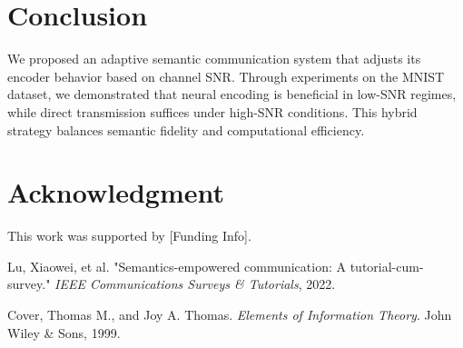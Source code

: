 \documentclass[conference]{IEEEtran}
\begin{document}
\section{Conclusion}
We proposed an adaptive semantic communication system that adjusts its encoder behavior based on channel SNR. Through experiments on the MNIST dataset, we demonstrated that neural encoding is beneficial in low-SNR regimes, while direct transmission suffices under high-SNR conditions. This hybrid strategy balances semantic fidelity and computational efficiency.

\section*{Acknowledgment}
This work was supported by [Funding Info].


\begin{thebibliography}{1}

Lu, Xiaowei, et al. "Semantics-empowered communication: A tutorial-cum-survey." \emph{IEEE Communications Surveys \& Tutorials}, 2022.

Cover, Thomas M., and Joy A. Thomas. \emph{Elements of Information Theory}. John Wiley \& Sons, 1999.

\end{thebibliography}
\end{document}
